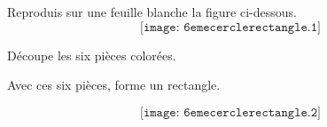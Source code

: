 \begin{myenumerate}
  \item Reproduis sur une feuille blanche la figure ci-dessous.
\[\texttt{[image: 6emecerclerectangle.1]}\]
\item Découpe les six pièces colorées.
\item Avec ces six pièces, forme un rectangle.
\end{myenumerate}
\[\texttt{[image: 6emecerclerectangle.2]}\]